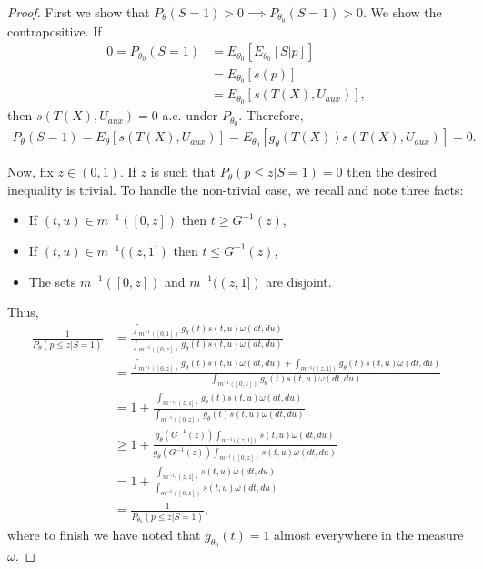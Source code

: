 \documentclass{article}
\begin{document}
\begin{appendix}
\begin{proof}

First we show that $P_{\theta}(S= 1) > 0 \implies P_{\theta_0}(S=1) > 0$. We show the contrapositive. If 
\begin{align*}
    0 = P_{\theta_0}(S=1) &= E_{\theta_0}[E_{\theta_0}[S | p]] \\
                          &= E_{\theta_0}[s(p)]\\
                          &= E_{\theta_0}[s(T(X), U_{aux})],
\end{align*} 
then $s(T(X), U_{aux}) = 0$ a.e. under $P_{\theta_0}$. Therefore,
\begin{align*}
    P_{\theta}(S=1) = E_{\theta}[s(T(X), U_{aux})] = E_{\theta_0}[g_{\theta}(T(X))s(T(X), U_{aux})] = 0.
\end{align*}

Now, fix $z \in (0, 1)$. If $z$ is such that $P_{\theta}(p \leq z | S = 1)  = 0$ then the desired inequality is trivial. To handle the non-trivial case, we recall  and note three facts:
\begin{itemize}
    \item If $(t, u) \in m^{-1}([0, z])$ then $t \geq G^{-1}(z)$,
    \item If $(t, u) \in m^{-1}((z, 1])$ then $t \leq G^{-1}(z)$,
    \item The sets $m^{-1}([0, z])$ and $m^{-1}((z, 1])$ are disjoint.
\end{itemize}
Thus,
\begin{align*}
     \frac{1}{P_{\theta}(p \leq z | S = 1)} &= \frac{\int_{m^{-1}([0, 1])} g_{\theta}(t) s(t, u) \omega(dt, du) }{\int_{m^{-1}([0, z])} g_{\theta}(t) s(t, u) \omega(dt, du) }\\
                                            &= \frac{\int_{m^{-1}([0, z])} g_{\theta}(t) s(t, u) \omega(dt, du) + \int_{m^{-1}((z, 1])} g_{\theta}(t)  s(t, u)\omega(dt, du) }{\int_{m^{-1}([0, z])} g_{\theta}(t) s(t, u) \omega(dt, du) }\\
                                            &= 1 + \frac{\int_{m^{-1}((z, 1])} g_{\theta}(t) s(t, u) \omega(dt, du)}{\int_{m^{-1}([0, z])} g_{\theta}(t) s(t, u) \omega(dt, du)}\\
                                            &\geq 1 + \frac{g_{\theta}(G^{-1}(z))  \int_{m^{-1}((z, 1])}  s(t, u) \omega(dt, du)}{g_{\theta}(G^{-1}(z)) \int_{m^{-1}([0, z])} s(t, u) \omega(dt, du)} \\
                                            &= 1 + \frac{\int_{m^{-1}((z, 1])} s(t, u) \omega(dt, du)}{ \int_{m^{-1}([0, z])} s(t, u) \omega(dt, du)} \\
                                            &= \frac{1}{P_{\theta_0}(p \leq z | S = 1)}, 
\end{align*}
where to finish we have noted that $g_{\theta_0}(t) = 1$ almost everywhere in the measure $\omega$. 
\end{proof}


\end{appendix}
\end{document}
